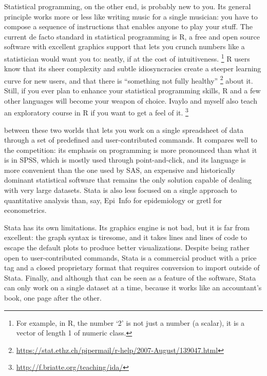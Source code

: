 Statistical programming, on the other end, is probably new to you. Its general principle works more or less like writing music for a single musician: you have to compose a sequence of instructions that enables anyone to play your stuff. The current de facto standard in statistical programming is R, a free and open source software with excellent graphics support that lets you crunch numbers like a statistician would want you to: neatly, if at the cost of intuitiveness.%
	\footnote{For example, in R, the number `2' is not just a number (\ie a scalar), it is a vector of length 1 of numeric class.} %
 	R users know that its sheer complexity and subtle idiosyncracies create a steeper learning curve for new users, and that there is ``something not fully healthy''%
	\footnote{%
		\url{https://stat.ethz.ch/pipermail/r-help/2007-August/139047.html}} %
		about it. Still, if you ever plan to enhance your statistical programming skills, R and a few other languages will become your weapon of choice. Ivaylo and myself also teach an exploratory course in R if you want to get a feel of it.%
	\footnote{\url{http://f.briatte.org/teaching/ida/}}%
%
%

 between these two worlds that lets you work on a single spreadsheet of data through a set of predefined and user-contributed commands. It compares well to the competition: its emphasis on programming is more pronounced than what it is in SPSS, which is mostly used through point-and-click, and its language is more convenient than the one used by SAS, an expensive and historically dominant statistical software that remains the only solution capable of dealing with very large datasets. Stata is also less focused on a single approach to quantitative analysis than, say, Epi~Info for epidemiology or gretl for econometrics.%
	
Stata has its own limitations. Its graphics engine is not bad, but it is far from excellent: the graph syntax is tiresome, and it takes lines and lines of code to escape the default plots to produce better visualizations. Despite being rather open to user-contributed commands, Stata is a commercial product with a price tag and a closed proprietary format that requires conversion to import outside of Stata. Finally, and although that can be seen as a feature of the software, Stata can only work on a single dataset at a time, because it works like an accountant's book, one page after the other.%

%
%
%
%
%
